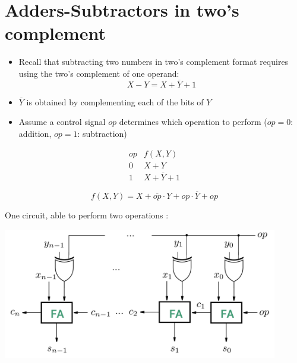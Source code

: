 \documentclass[12pt,openany]{book}
\begin{document}
			      	\newpage
			      	\section{Adders-Subtractors in two's complement}
			      	\begin{itemize}
			      		\item[] Recall that subtracting two numbers in two's complement format requires using the two's complement of one operand:
			      		      \begin{equation*}
			      		      	X - Y = X + \overline{Y} + 1
			      		      \end{equation*}
			      		\item[] $\overline{Y}$ is obtained by complementing each of the bits of $Y$
			      		\item[] Assume a control signal $op$ determines which operation to perform \newline($op = 0$: addition, $op = 1$: subtraction)
			      	\end{itemize}
			      	  
			      	\[
			      		\begin{array}{c|c}
			      			op & f(X, Y)              \\
			      			\hline
			      			0  & X + Y                \\
			      			1  & X + \overline{Y} + 1 
			      		\end{array}
			      	\]
			      	  
			      	\[
			      		f(X, Y) = X + \overline{op} \cdot Y + op \cdot \overline{Y} + op
			      	\]
			      	
			      	\vspace*{10px}
			      	
			      	One circuit, able to perform two operations :
			      	\begin{center}
			      		\begin{minipage}[c]{0.90\textwidth} %
			      			\centering
			      			\includegraphics[width=0.90\textwidth]{circuits/8.3.png} %
			      		\end{minipage}
			      	\end{center}
			      	
\end{document}
